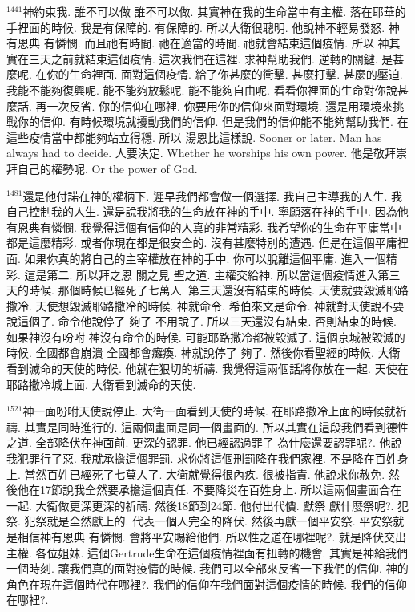\documentclass{book}
\begin{document}
$^{1441}$神約束我.
誰不可以做 誰不可以做.
其實神在我的生命當中有主權.
落在耶華的手裡面的時候.
我是有保障的.
有保障的.
所以大衛很聰明.
他說神不輕易發怒.
神有恩典 有憐憫.
而且祂有時間.
祂在適當的時間.
祂就會結束這個疫情.
所以 神其實在三天之前就結束這個疫情.
這次我們在這裡.
求神幫助我們.
逆轉的關鍵.
是甚麼呢.
在你的生命裡面.
面對這個疫情.
給了你甚麼的衝擊.
甚麼打擊.
甚麼的壓迫.
我能不能夠復興呢.
能不能夠放鬆呢.
能不能夠自由呢.
看看你裡面的生命對你說甚麼話.
再一次反省.
你的信仰在哪裡.
你要用你的信仰來面對環境.
還是用環境來挑戰你的信仰.
有時候環境就擾動我們的信仰.
但是我們的信仰能不能夠幫助我們.
在這些疫情當中都能夠站立得穩.
所以 湯恩比這樣說.
Sooner or later.
Man has always had to decide.
人要決定.
Whether he worships his own power.
他是敬拜崇拜自己的權勢呢.
Or the power of God.

$^{1481}$還是他付諾在神的權柄下.
遲早我們都會做一個選擇.
我自己主導我的人生.
我自己控制我的人生.
還是說我將我的生命放在神的手中.
寧願落在神的手中.
因為他有恩典有憐憫.
我覺得這個有信仰的人真的非常精彩.
我希望你的生命在平庸當中都是這麼精彩.
或者你現在都是很安全的.
沒有甚麼特別的遭遇.
但是在這個平庸裡面.
如果你真的將自己的主宰權放在神的手中.
你可以脫離這個平庸.
進入一個精彩.
這是第二.
所以拜之恩 關之見 聖之道.
主權交給神.
所以當這個疫情進入第三天的時候.
那個時候已經死了七萬人.
第三天還沒有結束的時候.
天使就要毀滅耶路撒冷.
天使想毀滅耶路撒冷的時候.
神就命令.
希伯來文是命令.
神就對天使說不要說這個了.
命令他說停了 夠了 不用說了.
所以三天還沒有結束.
否則結束的時候.
如果神沒有吩咐 神沒有命令的時候.
可能耶路撒冷都被毀滅了.
這個京城被毀滅的時候.
全國都會崩潰 全國都會癱瘓.
神就說停了 夠了.
然後你看聖經的時候.
大衛看到滅命的天使的時候.
他就在狠切的祈禱.
我覺得這兩個話將你放在一起.
天使在耶路撒冷城上面.
大衛看到滅命的天使.

$^{1521}$神一面吩咐天使說停止.
大衛一面看到天使的時候.
在耶路撒冷上面的時候就祈禱.
其實是同時進行的.
這兩個畫面是同一個畫面的.
所以其實在這段我們看到德性之道.
全部降伏在神面前.
更深的認罪.
他已經認過罪了 為什麼還要認罪呢?.
他說我犯罪行了惡.
我就承擔這個罪罰.
求你將這個刑罰降在我們家裡.
不是降在百姓身上.
當然百姓已經死了七萬人了.
大衛就覺得很內疚.
很被指責.
他說求你赦免.
然後他在17節說我全然要承擔這個責任.
不要降災在百姓身上.
所以這兩個畫面合在一起.
大衛做更深更深的祈禱.
然後18節到24節.
他付出代價.
獻祭 獻什麼祭呢?.
犯祭.
犯祭就是全然獻上的.
代表一個人完全的降伏.
然後再獻一個平安祭.
平安祭就是相信神有恩典 有憐憫.
會將平安賜給他們.
所以性之道在哪裡呢?.
就是降伏交出主權.
各位姐妹.
這個Gertrude生命在這個疫情裡面有扭轉的機會.
其實是神給我們一個時刻.
讓我們真的面對疫情的時候.
我們可以全部來反省一下我們的信仰.
神的角色在現在這個時代在哪裡?.
我們的信仰在我們面對這個疫情的時候.
我們的信仰在哪裡?.
\end{document}
